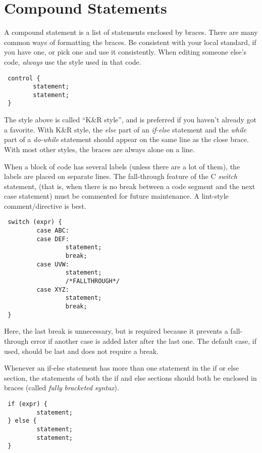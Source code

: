 \section{Compound Statements}
 A compound statement is a list of statements enclosed by braces. There are
many common ways of formatting the braces. Be consistent with your local
standard, if you have one, or pick one and use it consistently. When editing
someone else's code, {\em always} use the style used in that code. 

\begin{verbatim}
 control {
        statement;
        statement;
 } 
\end{verbatim}

The style above is called ``K\&R style'', and is preferred if you haven't
already got a favorite. With K\&R style, the {\em else} part of an
{\em if-else} statement and the {\em while} part of a {\em do-while} statement
should appear on the same line as the close brace. With most other styles, the
braces are always alone on a line.

 When a block of code has several labels (unless there are a lot of them), the
labels are placed on separate lines. The fall-through feature of the C
{\em switch} statement, (that is, when there is no break between a code
segment and the next case statement) must be commented for future
maintenance. A lint-style comment/directive is best. 

\begin{verbatim}
 switch (expr) {
         case ABC:
         case DEF:
                 statement;
                 break;
         case UVW:
                 statement;
                 /*FALLTHROUGH*/
         case XYZ:
                 statement;
                 break;
 } 
\end{verbatim}

 Here, the last break is unnecessary, but is required because it prevents a
fall-through error if another case is added later after the last one. The
default case, if used, should be last and does not require a break. 

 Whenever an if-else statement has more than one statement in the if or else
section, the statements of both the if and else sections should both be
enclosed in braces (called {\em fully} {\em bracketed} {\em syntax}). 

\begin{verbatim}
 if (expr) {
         statement;
 } else {
         statement;
         statement;
 } 
\end{verbatim}

